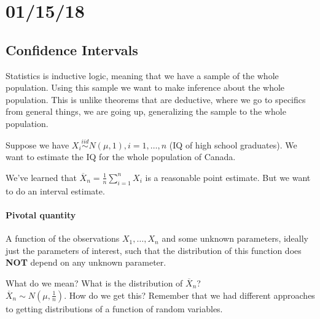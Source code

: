 \documentclass[12 pt]{article}
\begin{document}
    \section{01/15/18}
    \subsection{Confidence Intervals}
    Statistics is inductive logic, meaning that we have a sample of
    the whole population. Using this sample we want to make inference
    about the whole population. This is unlike theorems that are
    deductive, where we go to specifics from general things, we are
    going up, generalizing the sample to the whole population.

    Suppose we have $X_i \stackrel{iid}{\sim} N(\mu,1), i=1,\ldots,n$ (IQ of high
    school graduates). We want to estimate the IQ for the whole
    population of Canada.

    We've learned that $\overline{X}_n = \frac{1}{n} \sum_{i=1}^n X_i$
    is a reasonable point estimate. But we want to do an interval
    estimate.

    \paragraph{Pivotal quantity} A function of the observations $X_1,
    \ldots, X_n$ and some unknown parameters, ideally just the
    parameters of interest, such that the distribution of this
    function does \textbf{NOT} depend on any unknown parameter.

    What do we mean? What is the distribution of $\overline{X}_n$?
    \\ $\overline{X}_n \sim N(\mu, \frac{1}{n})$. How do we get this?
    Remember that we had different approaches to getting distributions
    of a function of random variables.
\end{document}
